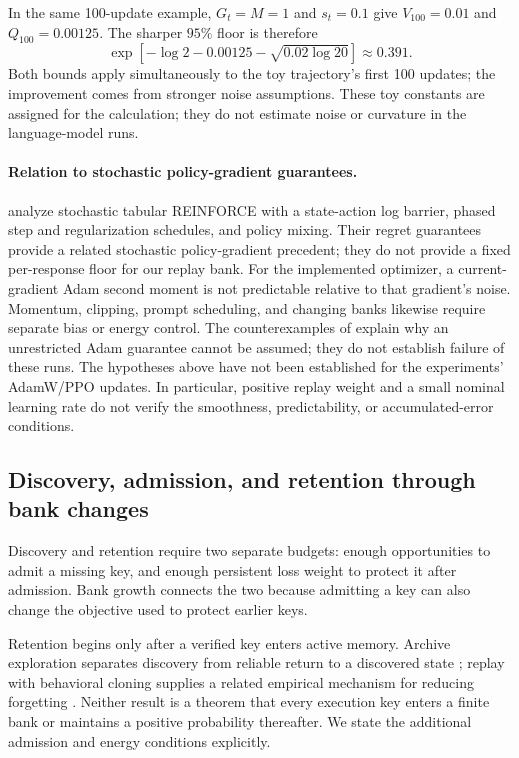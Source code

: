 \documentclass{article}
\newcommand{\1}{\mathbf 1}
\theoremstyle{remark}
\theoremstyle{definition}
\theoremstyle{plain}
\begin{document}
In the same 100-update example, $G_t=M=1$ and $s_t=0.1$ give
$V_{100}=0.01$ and $Q_{100}=0.00125$. The sharper $95\%$ floor is therefore
\[
 \exp\!\left[-\log2-0.00125-\sqrt{0.02\log20}\right]\approx0.391.
\]
Both bounds apply simultaneously to the toy trajectory's first 100 updates;
the improvement comes from stronger noise assumptions. These toy constants are assigned for the calculation; they do not
estimate noise or curvature in the language-model runs.

\paragraph{Relation to stochastic policy-gradient guarantees.}
\citet{zhang2021reinforce} analyze stochastic tabular REINFORCE with a
state-action log barrier, phased step and regularization schedules, and
policy mixing. Their regret guarantees provide a related stochastic
policy-gradient precedent; they do not provide a fixed per-response floor
for our replay bank. For the implemented optimizer, a current-gradient Adam
second moment is not predictable relative to that gradient's noise.
Momentum, clipping, prompt scheduling, and changing banks likewise require
separate bias or energy control. The counterexamples of
\citet{reddi2018adam} explain why an unrestricted Adam guarantee cannot be
assumed; they do not establish failure of these runs. The hypotheses above
have not been established for the experiments' AdamW/PPO updates. In
particular, positive replay weight and a small nominal learning rate do not
verify the smoothness, predictability, or accumulated-error conditions.

\subsection{Discovery, admission, and retention through bank changes}
\label{app:theory-discovery-admission}

Discovery and retention require two separate budgets: enough opportunities
to admit a missing key, and enough persistent loss weight to protect it
after admission. Bank growth connects the two because admitting a key can
also change the objective used to protect earlier keys.

Retention begins only after a verified key enters active memory. Archive
exploration separates discovery from reliable return to a discovered state
\citep{ecoffet2021return}; replay with behavioral cloning supplies a related
empirical mechanism for reducing forgetting \citep{rolnick2019replay}.
Neither result is a theorem that every execution key enters a finite bank
or maintains a positive probability thereafter. We state the additional
admission and energy conditions explicitly.
\end{document}
